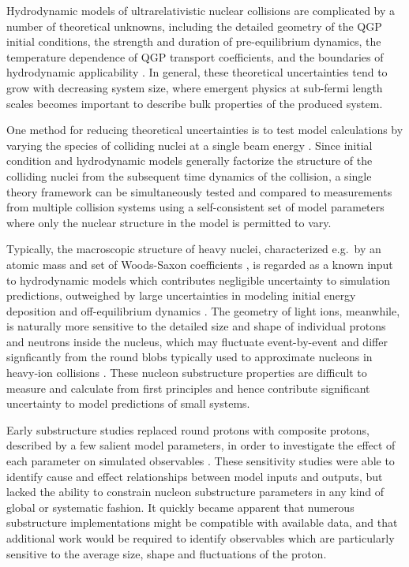 \documentclass[aps,prc,reprint,amsmath,nofootinbib]{revtex4-1}
\begin{document}
Hydrodynamic models of ultrarelativistic nuclear collisions are complicated by a number of theoretical unknowns, including the detailed geometry of the QGP initial conditions, the strength and duration of pre-equilibrium dynamics, the temperature dependence of QGP transport coefficients, and the boundaries of hydrodynamic applicability \cite{Niemi:2014lha, deSouza:2015ena, Ollitrault:2012cm, Song:2012ua}.
In general, these theoretical uncertainties tend to grow with decreasing system size, where emergent physics at sub-fermi length scales becomes important to describe bulk properties of the produced system.

One method for reducing theoretical uncertainties is to test model calculations by varying the species of colliding nuclei at a single beam energy \cite{Adare:2015bua, Schenke:2014tga, Aidala:2018mcw, Adare:2017wlc, Adamczyk:2015obl, Shen:2016zpp, Aidala:2017ajz, Adare:2006ti}.
Since initial condition and hydrodynamic models generally factorize the structure of the colliding nuclei from the subsequent time dynamics of the collision, a single theory framework can be simultaneously tested and compared to measurements from multiple collision systems using a self-consistent set of model parameters where only the nuclear structure in the model is permitted to vary.

Typically, the macroscopic structure of heavy nuclei, characterized e.g.\ by an atomic mass and set of Woods-Saxon coefficients \cite{MOLLER1995185, DEVRIES1987495}, is regarded as a known input to hydrodynamic models which contributes negligible uncertainty to simulation predictions, outweighed by large uncertainties in modeling initial energy deposition and off-equilibrium dynamics \cite{Niemi:2014lha, Song:2011hk, Retinskaya:2013gca, Liu:2015nwa, Kurkela:2016vts}.
The geometry of light ions, meanwhile, is naturally more sensitive to the detailed size and shape of individual protons and neutrons inside the nucleus, which may fluctuate event-by-event and differ signficantly from the round blobs typically used to approximate nucleons in heavy-ion collisions \cite{Schenke:2014zha, Welsh:2016siu, Moreland:2017kdx, Schenke:2014gaa, Schlichting:2014ipa}.
These nucleon substructure properties are difficult to measure and calculate from first principles and hence contribute significant uncertainty to model predictions of small systems.

Early substructure studies replaced round protons with composite protons, described by a few salient model parameters, in order to investigate the effect of each parameter on simulated observables \cite{Adler:2013aqf, Mitchell:2016jio, Welsh:2016siu}.
These sensitivity studies were able to identify cause and effect relationships between model inputs and outputs, but lacked the ability to constrain nucleon substructure parameters in any kind of global or systematic fashion.
It quickly became apparent that numerous substructure implementations might be compatible with available data, and that additional work would be required to identify observables which are particularly sensitive to the average size, shape and fluctuations of the proton.
\end{document}
